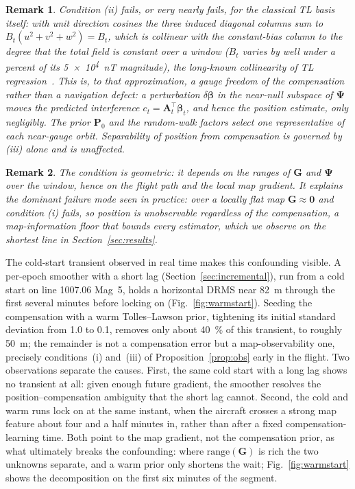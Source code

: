 \documentclass{IEEEtaes}
\newtheorem{remark}{Remark}
\begin{document}
\begin{remark}\label{rem:gauge}
Condition (ii) fails, or very nearly fails, for the classical TL basis itself: with
unit direction cosines the three induced diagonal columns sum to
$B_t(u^2{+}v^2{+}w^2)=B_t$, which is collinear with the constant-bias column to the
degree that the total field is constant over a window ($B_t$ varies by well under a
percent of its \SI{5e4}{\nano\tesla} magnitude), the long-known collinearity of TL
regression~\cite{leliak1961,noriega2015}. This is, to that approximation, a gauge
freedom of the compensation rather than a navigation defect: a perturbation
$\delta\boldsymbol{\beta}$ in the near-null subspace of $\boldsymbol{\Psi}$ moves
the predicted interference $c_t=\mathbf{A}_t^{\top}\boldsymbol{\beta}_t$, and hence
the position estimate, only negligibly. The prior $\mathbf{P}_0$ and the
random-walk factors select one representative of each near-gauge orbit.
Separability of position from compensation is governed by (iii) alone and is
unaffected.
\end{remark}

\begin{remark}\label{rem:floor}
The condition is geometric: it depends on the ranges of $\mathbf{G}$ and
$\boldsymbol{\Psi}$ over the window, hence on the flight path and the local map
gradient. It explains the dominant failure mode seen in practice: over a locally
flat map $\mathbf{G}\!\approx\!\mathbf{0}$ and condition (i) fails, so position is
unobservable regardless of the compensation, a map-information floor that bounds
every estimator, which we observe on the shortest line in Section~\ref{sec:results}.
\end{remark}

The cold-start transient observed in real time makes this confounding visible. A
per-epoch smoother with a short lag (Section~\ref{sec:incremental}), run from a cold
start on line 1007.06 Mag~5, holds a horizontal DRMS near \SI{82}{\meter} through the
first several minutes before locking on (Fig.~\ref{fig:warmstart}). Seeding the
compensation with a warm Tolles--Lawson prior, tightening its initial standard
deviation from \num{1.0} to \num{0.1}, removes only about \SI{40}{\percent} of this transient, to
roughly \SI{50}{\meter}; the remainder is not a compensation error but a
map-observability one, precisely conditions~(i) and~(iii) of
Proposition~\ref{prop:obs} early in the flight. Two observations separate the causes.
First, the same cold start with a long lag shows no transient at all: given enough
future gradient, the smoother resolves the position--compensation ambiguity that the
short lag cannot. Second, the cold and warm runs lock on at the same instant, when the
aircraft crosses a strong map feature about four and a half minutes in, rather than
after a fixed compensation-learning time. Both point to the map gradient, not the
compensation prior, as what ultimately breaks the confounding: where
$\mathrm{range}(\mathbf{G})$ is rich the two unknowns separate, and a warm prior only
shortens the wait; Fig.~\ref{fig:warmstart} shows the decomposition on the first six
minutes of the segment.
\end{document}
